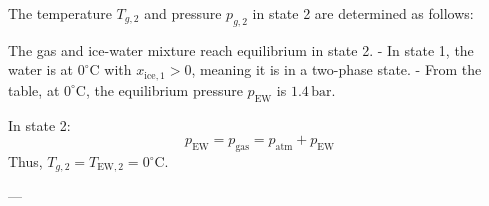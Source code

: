 The temperature \( T_{g,2} \) and pressure \( p_{g,2} \) in state 2 are determined as follows:  

The gas and ice-water mixture reach equilibrium in state 2.  
- In state 1, the water is at \( 0^\circ\text{C} \) with \( x_{\text{ice},1} > 0 \), meaning it is in a two-phase state.  
- From the table, at \( 0^\circ\text{C} \), the equilibrium pressure \( p_{\text{EW}} \) is \( 1.4 \, \text{bar} \).  

In state 2:  
\[
p_{\text{EW}} = p_{\text{gas}} = p_{\text{atm}} + p_{\text{EW}}
\]  
Thus, \( T_{g,2} = T_{\text{EW},2} = 0^\circ\text{C} \).  

---